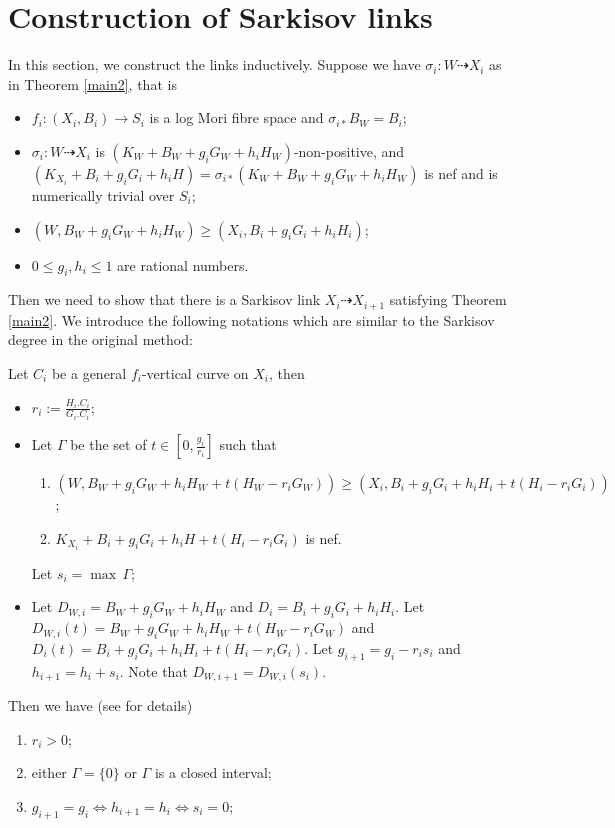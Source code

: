 \section{Construction of Sarkisov links}
In this section, we construct the links inductively. Suppose we have $\sigma_{i}:W\dashrightarrow X_{i}$ as in Theorem  \ref{main2}, that is
\begin{itemize}
  \item $f_{i}:(X_{i},B_{i})\to S_{i}$ is a log Mori fibre space and $\sigma_{i*} B_{W}=B_{i}$;
  \item $\sigma_{i}:W\dashrightarrow  X_{i}$ is $(K_{W}+B_{W}+g_{i}G_{W}+h_{i}H_{W})$-non-positive, and $(K_{X_{i}}+B_{i}+g_{i}G_{i}+h_{i}H)=\sigma_{i*}(K_{W}+B_{W}+g_{i}G_{W}+h_{i}H_{W})$ is nef and is numerically trivial over $S_{i}$;
  \item $(W,B_{W}+g_{i}G_{W}+h_{i}H_{W})\geqslant (X_{i},B_{i}+g_{i}G_{i}+h_{i}H_{i})$;
  \item $0\leqslant g_{i},h_{i}\leqslant 1$ are  rational numbers.
\end{itemize}
Then we need to show that there is a Sarkisov link $X_{i}\dashrightarrow X_{i+1}$ satisfying  Theorem \ref{main2}. We introduce the following notations which are similar to the Sarkisov degree in the original method:
\begin{definition}
  Let $C_{i}$ be a general $f_{i}$-vertical curve on $X_{i}$, then
  \begin{itemize}
    \item $r_{i}:=\frac{H_{i}.C_{i}}{G_{i}.C_{i}}$;
    \item Let $\Gamma$ be the set of $t\in [0,\frac{g_{i}}{r_{i}}] $ such that
      \begin{enumerate}
        \item\label{singularcondition} $\left(W,B_{W}+g_{i}G_{W}+h_{i}H_{W}+t(H_{W}-r_{i}G_{W})\right)\geqslant \left(X_{i},B_{i}+g_{i}G_{i}+h_{i}H_{i}+t\left(H_{i}-r_{i}G_{i}\right)\right)$;
        \item$K_{X_{i}}+B_{i}+g_{i}G_i+h_{i}H+t(H_{i}-r_{i}G_{i})$ is nef.
      \end{enumerate}
          Let $s_{i}=\max\, \Gamma $;
    \item Let $D_{W,i}=B_{W}+g_{i}G_{W}+h_{i}H_{W}$ and $D_{i}=B_{i}+g_{i}G_{i}+h_{i}H_{i}$. Let $D_{W,i}(t)=B_{W}+g_{i}G_{W}+h_{i}H_{W}+t(H_{W}-r_{i}G_{W})$ and $D_{i}(t)=B_{i}+g_{i}G_{i}+h_{i}H_{i}+t (H_{i}-r_{i}G_{i})$. Let $g_{i+1}=g_{i}-r_{i}s_{i}$ and $h_{i+1}=h_{i}+s_{i}$. Note that $D_{W,i+1}=D_{W,i}(s_{i})$.
  \end{itemize}
\end{definition}
Then we have (see \cite[Lemma 4.4]{liuSarkisovProgramGeneralized2021} for details)
\begin{enumerate}
  \item $r_{i}>0$;
  \item either $\Gamma=\{0\} $ or $\Gamma$ is a closed interval;
  \item $g_{i+1}=g_{i} \Leftrightarrow h_{i+1}=h_{i} \Leftrightarrow s_{i}=0$;
\end{enumerate}

